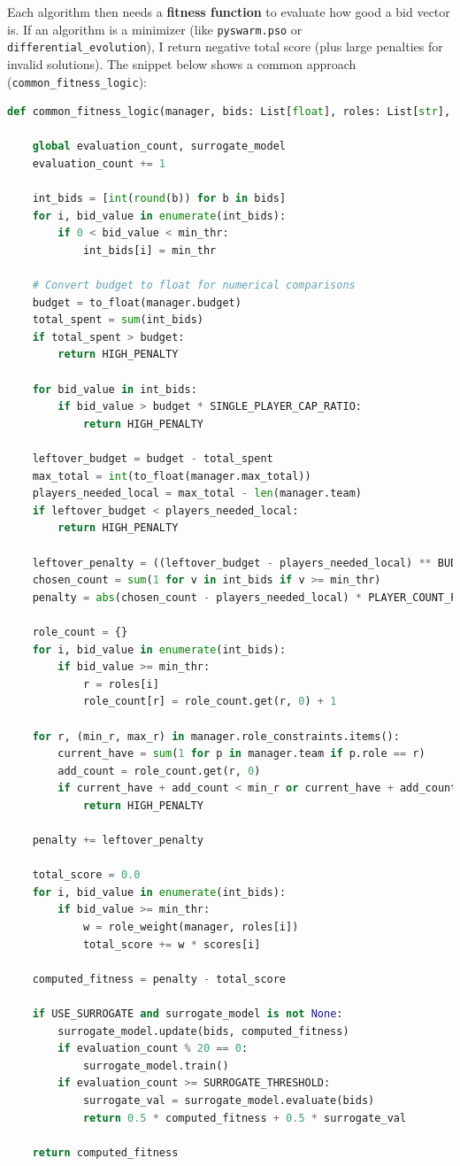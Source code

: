 \documentclass[sigconf]{acmart}
\begin{document}
	Each algorithm then needs a \textbf{fitness function} to evaluate how good a bid vector is. If an algorithm is a minimizer (like \texttt{pyswarm.pso} or \texttt{differential\_evolution}), I return negative total score (plus large penalties for invalid solutions). The snippet below shows a common approach (\texttt{common\_fitness\_logic}):
	
\begin{lstlisting}[language=Python, caption=Common fitness logic for PSO/DE/ES]
def common_fitness_logic(manager, bids: List[float], roles: List[str], scores: List[float], min_thr: int) -> float:

	global evaluation_count, surrogate_model
	evaluation_count += 1

	int_bids = [int(round(b)) for b in bids]
	for i, bid_value in enumerate(int_bids):
		if 0 < bid_value < min_thr:
			int_bids[i] = min_thr

	# Convert budget to float for numerical comparisons
	budget = to_float(manager.budget)
	total_spent = sum(int_bids)
	if total_spent > budget:
		return HIGH_PENALTY
	
	for bid_value in int_bids:
		if bid_value > budget * SINGLE_PLAYER_CAP_RATIO:
			return HIGH_PENALTY
	
	leftover_budget = budget - total_spent
	max_total = int(to_float(manager.max_total))
	players_needed_local = max_total - len(manager.team)
	if leftover_budget < players_needed_local:
		return HIGH_PENALTY
	
	leftover_penalty = ((leftover_budget - players_needed_local) ** BUDGET_LEFTOVER_EXP) * LEFTOVER_MULTIPLIER
	chosen_count = sum(1 for v in int_bids if v >= min_thr)
	penalty = abs(chosen_count - players_needed_local) * PLAYER_COUNT_PENALTY
	
	role_count = {}
	for i, bid_value in enumerate(int_bids):
		if bid_value >= min_thr:
			r = roles[i]
			role_count[r] = role_count.get(r, 0) + 1
	
	for r, (min_r, max_r) in manager.role_constraints.items():
		current_have = sum(1 for p in manager.team if p.role == r)
		add_count = role_count.get(r, 0)
		if current_have + add_count < min_r or current_have + add_count > max_r:
			return HIGH_PENALTY
	
	penalty += leftover_penalty
	
	total_score = 0.0
	for i, bid_value in enumerate(int_bids):
		if bid_value >= min_thr:
			w = role_weight(manager, roles[i])
			total_score += w * scores[i]
	
	computed_fitness = penalty - total_score
	
	if USE_SURROGATE and surrogate_model is not None:
		surrogate_model.update(bids, computed_fitness)
		if evaluation_count % 20 == 0:
			surrogate_model.train()
		if evaluation_count >= SURROGATE_THRESHOLD:
			surrogate_val = surrogate_model.evaluate(bids)
			return 0.5 * computed_fitness + 0.5 * surrogate_val
	
	return computed_fitness
\end{lstlisting}
	
\end{document}
